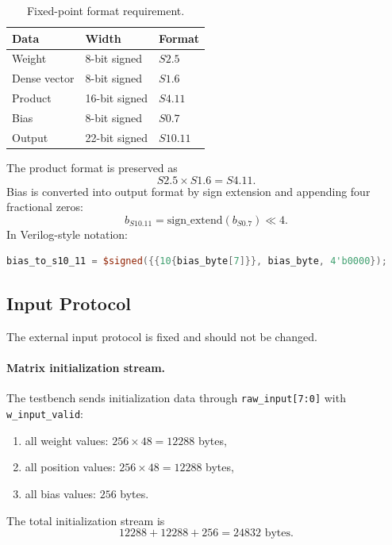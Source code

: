 \documentclass[11pt,a4paper]{article}
\begin{document}
\begin{table}[H]
\centering
\caption{Fixed-point format requirement.}
\begin{tabular}{lll}
\toprule
Data & Width & Format \\
\midrule
Weight & 8-bit signed & $S2.5$ \\
Dense vector & 8-bit signed & $S1.6$ \\
Product & 16-bit signed & $S4.11$ \\
Bias & 8-bit signed & $S0.7$ \\
Output & 22-bit signed & $S10.11$ \\
\bottomrule
\end{tabular}
\end{table}

The product format is preserved as
\begin{equation}
    S2.5 \times S1.6 = S4.11.
\end{equation}
Bias is converted into output format by sign extension and appending four fractional zeros:
\begin{equation}
    b_{S10.11} = \text{sign\_extend}(b_{S0.7}) \ll 4.
\end{equation}
In Verilog-style notation:
\begin{lstlisting}[language=Verilog]
bias_to_s10_11 = $signed({{10{bias_byte[7]}}, bias_byte, 4'b0000});
\end{lstlisting}

\subsection{Input Protocol}

The external input protocol is fixed and should not be changed.

\paragraph{Matrix initialization stream.}
The testbench sends initialization data through \texttt{raw\_input[7:0]} with \texttt{w\_input\_valid}:
\begin{enumerate}[nosep]
    \item all weight values: $256 \times 48 = 12288$ bytes,
    \item all position values: $256 \times 48 = 12288$ bytes,
    \item all bias values: $256$ bytes.
\end{enumerate}
The total initialization stream is
\begin{equation}
    12288 + 12288 + 256 = 24832 \text{ bytes}.
\end{equation}
\end{document}
